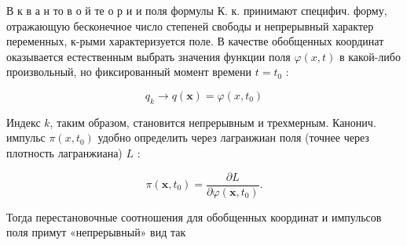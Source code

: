 \documentclass[10pt]{article}
\begin{document}
В к в а н то в о й те о р и и поля формулы К. к. принимают специфич. форму, отражающую бесконечное число степеней свободы и непрерывный характер переменных, к-рыми характеризуется поле. В качестве обобщенных координат оказывается естественным выбрать значения функции поля $\varphi(x, t)$ в какой-либо произвольный, но фиксированный момент времени $t=t_{0}$ :



\[

q_{k} \rightarrow q(\boldsymbol{x})=\varphi\left(x, t_{0}\right)

\]



Индекс $k$, таким образом, становится непрерывным и трехмерным. Канонич. импульс $\pi\left(x, t_{0}\right)$ удобно определить через лагранжиан поля (точнее через плотность лагранжиана) $L$ :



\[

\pi\left(\boldsymbol{x}, t_{0}\right)=\frac{\partial L}{\partial \varphi\left(\boldsymbol{x}, t_{0}\right)} .

\]



Тогда перестановочные соотношения для обобщенных координат и импульсов поля примут «непрерывный» вид так
\end{document}
